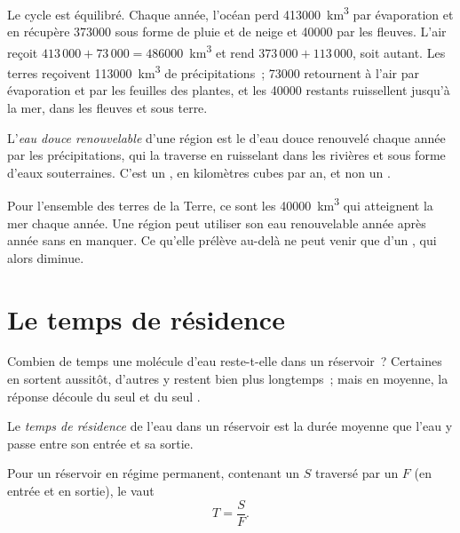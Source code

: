 Le cycle est équilibré. Chaque année, l'océan perd \num{413000}~\unit{km^3}
par évaporation et en récupère \num{373000} sous forme de pluie et de neige
et \num{40000} par les fleuves. L'air reçoit
$413\,000 + 73\,000 = \num{486000}$~\unit{km^3}
et rend $373\,000 + 113\,000$, soit autant. Les terres reçoivent
\num{113000}~\unit{km^3} de précipitations~; \num{73000} retournent à l'air
par évaporation et par les feuilles des plantes, et les \num{40000} restants
ruissellent jusqu'à la mer, dans les fleuves et sous terre.

\begin{definition}\label{def:g10:freshwater-resources:renewable}
L'\emph{eau douce renouvelable} d'une région
est le  d'eau douce renouvelé chaque année par les précipitations, qui
la traverse en ruisselant dans les rivières et sous forme d'eaux
souterraines. C'est un , en kilomètres cubes par an, et non un .
\end{definition}

Pour l'ensemble des terres de la Terre, ce sont les \num{40000}~\unit{km^3}
qui atteignent la mer chaque année. Une région peut utiliser son eau
renouvelable année après année sans en manquer. Ce qu'elle prélève au-delà
ne peut venir que d'un , qui alors diminue.

\section{Le temps de résidence}

Combien de temps une molécule d'eau reste-t-elle dans un réservoir~?
Certaines en sortent aussitôt, d'autres y restent bien plus longtemps~; mais
en moyenne, la réponse découle du seul  et du seul .

\begin{definition}\label{def:g10:freshwater-resources:residence-time}
Le \emph{temps de résidence}
de l'eau dans un réservoir est la durée moyenne que l'eau y passe entre son
entrée et sa sortie.
\end{definition}

\begin{proposition}\label{prop:g10:freshwater-resources:residence}
Pour un réservoir en régime permanent, contenant un  $S$ traversé par
un  $F$ (en entrée et en sortie), le  vaut
\[
T = \frac{S}{F}.
\]
\end{proposition}

